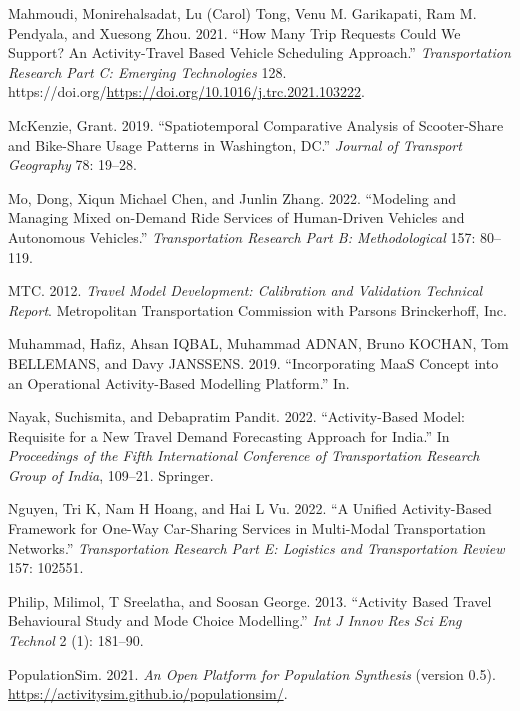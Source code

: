 \documentclass[12pt, oneside, openright]{byuthesis}
\newlength{\cslhangindent}
\newlength{\cslentryspacingunit} %
\newenvironment{CSLReferences}[2] %
 {%
  \setlength{\parindent}{0pt}
  \ifodd #1
  \let\oldpar\par
  \def\par{\hangindent=\cslhangindent\oldpar}
  \fi
  \setlength{\parskip}{#2\cslentryspacingunit}
 }%
 {}
\begin{document}
\begin{CSLReferences}{1}{0}
\leavevmode{}%
Mahmoudi, Monirehalsadat, Lu (Carol) Tong, Venu M. Garikapati, Ram M. Pendyala, and Xuesong Zhou. 2021. {``How Many Trip Requests Could We Support? An Activity-Travel Based Vehicle Scheduling Approach.''} \emph{Transportation Research Part C: Emerging Technologies} 128. https://doi.org/\url{https://doi.org/10.1016/j.trc.2021.103222}.

\leavevmode{}%
McKenzie, Grant. 2019. {``Spatiotemporal Comparative Analysis of Scooter-Share and Bike-Share Usage Patterns in Washington, DC.''} \emph{Journal of Transport Geography} 78: 19--28.

\leavevmode{}%
Mo, Dong, Xiqun Michael Chen, and Junlin Zhang. 2022. {``Modeling and Managing Mixed on-Demand Ride Services of Human-Driven Vehicles and Autonomous Vehicles.''} \emph{Transportation Research Part B: Methodological} 157: 80--119.

\leavevmode{}%
MTC. 2012. \emph{Travel Model Development: Calibration and Validation Technical Report}. Metropolitan Transportation Commission with Parsons Brinckerhoff, Inc.

\leavevmode{}%
Muhammad, Hafiz, Ahsan IQBAL, Muhammad ADNAN, Bruno KOCHAN, Tom BELLEMANS, and Davy JANSSENS. 2019. {``Incorporating MaaS Concept into an Operational Activity-Based Modelling Platform.''} In.

\leavevmode{}%
Nayak, Suchismita, and Debapratim Pandit. 2022. {``Activity-Based Model: Requisite for a New Travel Demand Forecasting Approach for India.''} In \emph{Proceedings of the Fifth International Conference of Transportation Research Group of India}, 109--21. Springer.

\leavevmode{}%
Nguyen, Tri K, Nam H Hoang, and Hai L Vu. 2022. {``A Unified Activity-Based Framework for One-Way Car-Sharing Services in Multi-Modal Transportation Networks.''} \emph{Transportation Research Part E: Logistics and Transportation Review} 157: 102551.

\leavevmode{}%
Philip, Milimol, T Sreelatha, and Soosan George. 2013. {``Activity Based Travel Behavioural Study and Mode Choice Modelling.''} \emph{Int J Innov Res Sci Eng Technol} 2 (1): 181--90.

\leavevmode{}%
PopulationSim. 2021. \emph{An Open Platform for Population Synthesis} (version 0.5). \url{https://activitysim.github.io/populationsim/}.


\end{CSLReferences}
\end{document}
